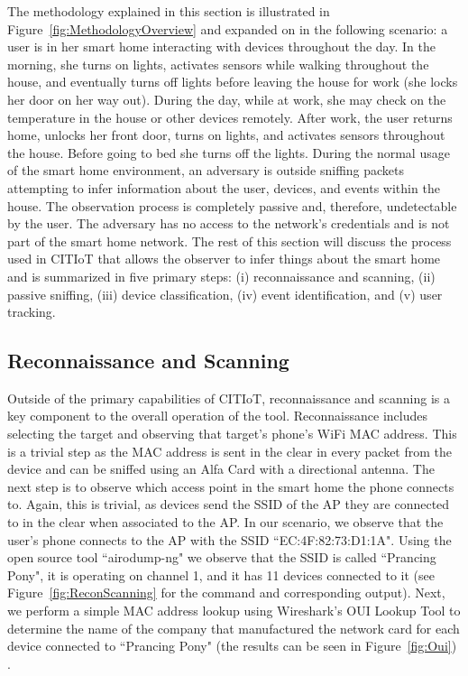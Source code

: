 The methodology explained in this section is illustrated in Figure~\ref{fig:MethodologyOverview} and expanded on in the following scenario: a user is in her smart home interacting with devices throughout the day. In the morning, she turns on lights, activates sensors while walking throughout the house, and eventually turns off lights before leaving the house for work (she locks her door on her way out). During the day, while at work, she may check on the temperature in the house or other devices remotely. After work, the user returns home, unlocks her front door, turns on lights, and activates sensors throughout the house. Before going to bed she turns off the lights. During the normal usage of the smart home environment, an adversary is outside sniffing packets attempting to infer information about the user, devices, and events within the house. The observation process is completely passive and, therefore, undetectable by the user. The adversary has no access to the network's credentials and is not part of the smart home network. The rest of this section will discuss the process used in CITIoT that allows the observer to infer things about the smart home and is summarized in five primary steps: (i) reconnaissance and scanning, (ii) passive sniffing, (iii) device classification, (iv) event identification, and (v) user tracking.

\figMethodologyOverview

\subsection{Reconnaissance and Scanning}
Outside of the primary capabilities of CITIoT, reconnaissance and scanning is a key component to the overall operation of the tool. Reconnaissance includes selecting the target and observing that target's phone's WiFi \ac{MAC} address. This is a trivial step as the \ac{MAC} address is sent in the clear in every packet from the device and can be sniffed using an Alfa Card with a directional antenna. The next step is to observe which access point in the smart home the phone connects to. Again, this is trivial, as devices send the \ac{SSID} of the \ac{AP} they are connected to in the clear when associated to the \ac{AP}. In our scenario, we observe that the user's phone connects to the \ac{AP} with the SSID ``EC:4F:82:73:D1:1A". Using the open source tool ``airodump-ng" we observe that the SSID is called ``Prancing Pony", it is operating on channel 1, and it has 11 devices connected to it (see Figure~\ref{fig:ReconScanning} for the command and corresponding output). Next, we perform a simple MAC address lookup using Wireshark's OUI Lookup Tool to determine the name of the company that manufactured the network card for each device connected to ``Prancing Pony" (the results can be seen in Figure~\ref{fig:Oui}) \cite{ouiLookup}. 

